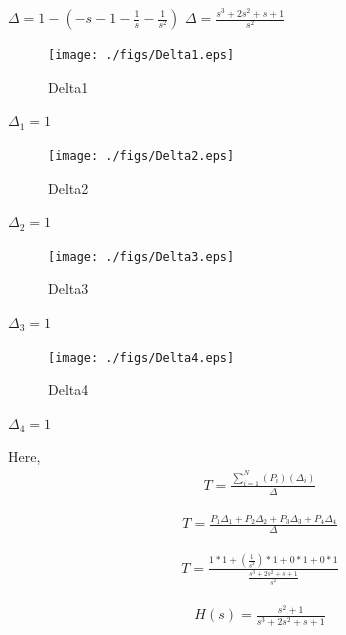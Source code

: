 \begin{enumerate}[label=\thesection.\arabic*.,ref=\thesection.\theenumi]
$\Delta = 1-(-s-1-\frac{1}{s}-\frac{1}{s^2})$
$\Delta = \frac{s^3+2s^2+s+1}{s^2}$

\begin{figure}
\centering
\texttt{[image: ./figs/Delta1.eps]}
\caption{Delta1}
\label{fig:sec_order}
\end{figure}


$\Delta_1 = 1$

\begin{figure}
\centering
\texttt{[image: ./figs/Delta2.eps]}
\caption{Delta2}
\label{fig:sec_order}
\end{figure}


$\Delta_2 = 1$

\begin{figure}
\centering
\texttt{[image: ./figs/Delta3.eps]}
\caption{Delta3}
\label{fig:sec_order}
\end{figure}


$\Delta_3 = 1$

\begin{figure}
\centering
\texttt{[image: ./figs/Delta4.eps]}
\caption{Delta4}
\label{fig:sec_order}
\end{figure}

$\Delta_4 = 1$

Here, 
\begin{align}
T=\frac{\sum_{i=1}^{N}(P_i)(\Delta_i)}{\Delta}
\end{align}

\begin{align}
T=\frac{P_1 \Delta_1+P_2 \Delta_2+P_3 \Delta_3+P_4 \Delta_4}{\Delta}
\end{align}

\begin{align}
T=\frac{1*1 +(\frac{1}{s^2})*1 + 0*1 + 0*1 }{\frac{s^3+2s^2+s+1}{s^2}}
\end{align}

\begin{align}
H(s)=\frac{s^2+1}{s^3+2s^2+s+1}
\end{align}

\end{enumerate}